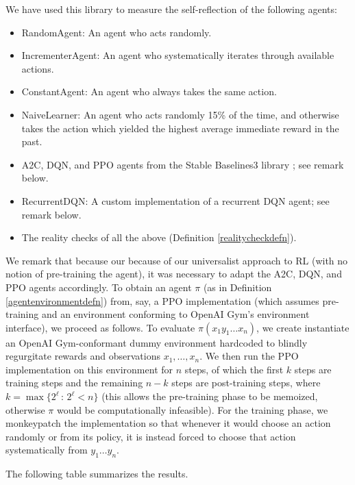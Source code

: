\documentclass{article}
\begin{document}
We have used this library to measure the self-reflection of the following agents:
\begin{itemize}
  \item RandomAgent: An agent who acts randomly.
  \item IncrementerAgent: An agent who systematically iterates through available
    actions.
  \item ConstantAgent: An agent who always takes the same action.
  \item NaiveLearner: An agent who acts randomly 15\% of the time, and otherwise
    takes the action which yielded the highest average immediate reward in the past.
  \item A2C, DQN, and PPO agents from the Stable Baselines3 library
    \cite{stable-baselines3}; see remark below.
  \item RecurrentDQN: A custom implementation of a recurrent DQN agent; see remark below.
  \item The reality checks of all the above (Definition \ref{realitycheckdefn}).
\end{itemize}
We remark that because our because of our universalist approach to RL (with no notion of
pre-training the agent), it was necessary to adapt the A2C, DQN, and PPO agents accordingly.
To obtain an agent $\pi$ (as in Definition \ref{agentenvironmentdefn}) from,
say, a PPO implementation (which assumes pre-training and an environment conforming to
OpenAI Gym's environment interface),
we proceed as follows. To evaluate
$\pi(x_1y_1\ldots x_n)$, we create instantiate an OpenAI Gym-conformant dummy environment
hardcoded to blindly regurgitate rewards and observations $x_1,\ldots,x_n$.
We then run the PPO implementation on this environment for $n$ steps, of which the first
$k$ steps are training steps and the remaining $n-k$ steps are post-training steps,
where $k=\max\{2^\ell\,:\,2^\ell<n\}$
(this allows the pre-training phase to be memoized, otherwise $\pi$ would be
computationally infeasible). For the training phase, we monkeypatch the implementation
so that whenever it would choose an action randomly or from its policy, it is instead
forced to choose that action systematically from $y_1\ldots y_n$.

The following table summarizes the results.
\end{document}

